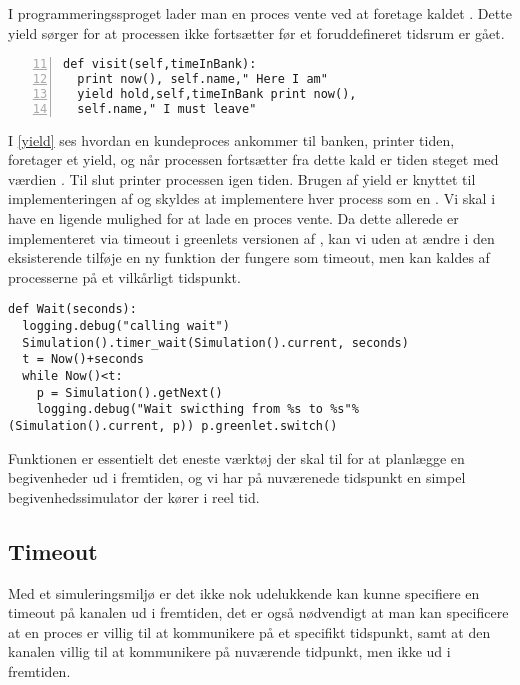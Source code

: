 I programmeringssproget \simpy lader man en proces vente ved at
foretage kaldet . Dette yield sørger for at processen ikke
fortsætter før et foruddefineret tidsrum er gået.

\begin{lstlisting}[firstnumber=11 , stepnumber=2, numbers=left,float=hbtp, label=yield, caption= Et yield i \simpy (Taget fra Bank05.py i eksemplet fra \simpy)] 
def visit(self,timeInBank): 
  print now(), self.name," Here I am" 
  yield hold,self,timeInBank print now(),
  self.name," I must leave" 
\end{lstlisting}

I \cref{yield} ses hvordan en kundeproces ankommer til banken,
printer tiden, foretager et yield, og når processen fortsætter
fra dette kald er tiden steget med værdien .
Til slut printer processen igen tiden. Brugen af yield er knyttet
til implementeringen af \simpy og skyldes at \simpy implementere
hver process som en . Vi skal i \pycsp have en
ligende mulighed for at lade en proces vente. Da dette allerede er
implementeret via timeout i greenlets versionen af \pycsp, kan vi
uden at ændre i den eksisterende \sched tilføje en ny funktion
 der fungere som timeout, men kan kaldes af processerne
på et vilkårligt tidspunkt. 

\begin{lstlisting}[firstnumber=20,float=hbtp, label=wait, caption=Wait i simuleringsversionen.] 
def Wait(seconds): 
  logging.debug("calling wait")
  Simulation().timer_wait(Simulation().current, seconds) 
  t = Now()+seconds
  while Now()<t: 
    p = Simulation().getNext() 
    logging.debug("Wait swicthing from %s to %s"%(Simulation().current, p)) p.greenlet.switch()
\end{lstlisting}

Funktionen  er essentielt det eneste værktøj der skal til for at planlægge en begivenheder ud i fremtiden, og vi har på nuværenede tidspunkt en  simpel begivenhedssimulator der kører i reel tid.

\subsection{Timeout} 
Med et simuleringsmiljø er det ikke nok
udelukkende kan kunne specifiere en timeout på kanalen ud i fremtiden,
det er også nødvendigt at man kan specificere at en proces er villig
til at kommunikere på et specifikt tidspunkt, samt at den kanalen
villig til at kommunikere på nuværende tidpunkt, men ikke ud i
fremtiden.

